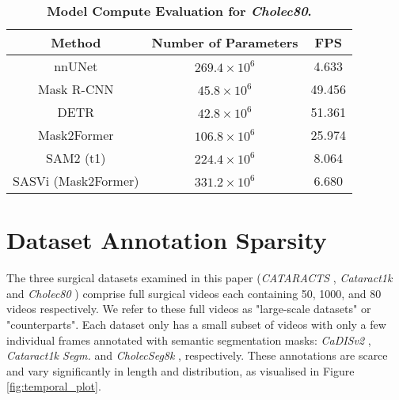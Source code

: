 \begin{table}[htbp]
    \centering
    \begin{tabular}{c|cc}
         \textbf{Method} & \textbf{Number of Parameters} & \textbf{FPS} \\
         \hline
         nnUNet & $269.4 \times 10^6$ & 4.633 \\
         Mask R-CNN & $45.8 \times 10^6$ & 49.456 \\
         DETR & $42.8 \times 10^6$ & 51.361 \\
         Mask2Former & $106.8 \times 10^6$ & 25.974 \\
         \hline
         SAM2 (t1) & $224.4 \times 10^6$ & 8.064 \\ 
         SASVi (Mask2Former) & $331.2 \times 10^6$ & 6.680
    \end{tabular}
    \caption{\textbf{Model Compute Evaluation for \emph{Cholec80}.}}
    \label{tab:efficiency}
\end{table}

\section{Dataset Annotation Sparsity}
\label{sec:app_scarce}

The three surgical datasets examined in this paper (\emph{CATARACTS} \cite{al2019cataracts}, \emph{Cataract1k} \cite{ghamsarian2023cataract} and \emph{Cholec80} \cite{twinanda2016endonet}) comprise full surgical videos each containing 50, 1000, and 80 videos respectively. We refer to these full videos as "large-scale datasets" or "counterparts". Each dataset only has a small subset of videos with only a few individual frames annotated with semantic segmentation masks: \emph{CaDISv2} \cite{grammatikopoulou2021cadis}, \emph{Cataract1k Segm.} \cite{ghamsarian2023cataract} and \emph{CholecSeg8k} \cite{hong2020cholecseg8k}, respectively. These annotations are scarce and vary significantly in length and distribution, as visualised in Figure \ref{fig:temporal_plot}. 

